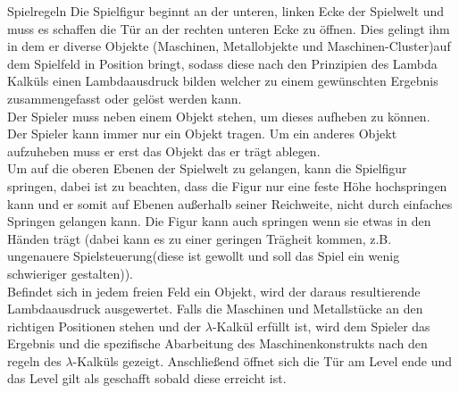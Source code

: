 \documentclass{scrartcl}
\begin{document}
\begin{description}

\begin{minipage}{1\textwidth}
	\item[Spielregeln] \label{spielaufbau:Spielregeln} Die Spielfigur beginnt an der unteren, linken Ecke der Spielwelt und muss es schaffen die Tür an der rechten unteren Ecke zu öffnen. Dies gelingt ihm in dem er diverse Objekte (Maschinen, Metallobjekte und Maschinen-Cluster)auf dem Spielfeld in Position bringt, sodass diese nach den Prinzipien des Lambda Kalküls einen Lambdaausdruck bilden  welcher zu einem gewünschten Ergebnis zusammengefasst oder gelöst werden kann.\\
	Der Spieler muss neben einem Objekt stehen, um dieses aufheben zu können.\\
	Der Spieler kann immer nur ein Objekt tragen. Um ein anderes Objekt aufzuheben muss er erst das Objekt das er trägt ablegen.\\
	Um auf die oberen Ebenen der Spielwelt zu gelangen, kann die Spielfigur springen, dabei ist zu beachten, dass die Figur nur eine feste Höhe hochspringen kann und er somit auf Ebenen außerhalb seiner Reichweite, nicht durch einfaches Springen gelangen kann. Die Figur kann auch springen wenn sie etwas in den Händen trägt (dabei kann es zu einer geringen Trägheit kommen, z.B. ungenauere Spielsteuerung(diese ist gewollt und soll das Spiel ein wenig schwieriger gestalten)).\\
	Befindet sich in jedem freien Feld ein Objekt, wird der daraus resultierende Lambdaausdruck ausgewertet. Falls die Maschinen und Metallstücke an den richtigen Positionen stehen und der $\lambda$-Kalkül erfüllt ist, wird dem Spieler das Ergebnis und die spezifische Abarbeitung des Maschinenkonstrukts nach den regeln des $\lambda$-Kalküls gezeigt. Anschließend öffnet sich die Tür am Level ende und das Level gilt als geschafft sobald diese erreicht ist.\\
	
\end{minipage}


\end{description}
\end{document}
